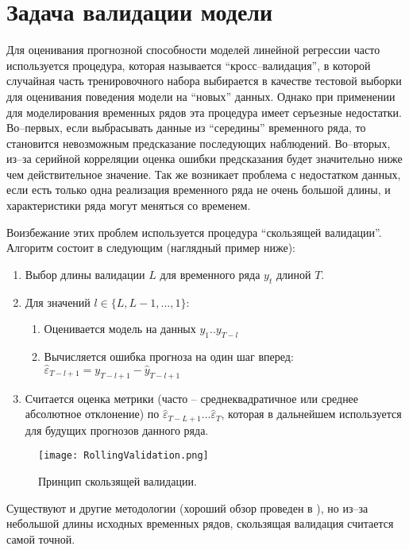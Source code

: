 \documentclass[a4paper,14pt]{extreport}
\begin{document}
	\section{Задача валидации модели}
	
	Для оценивания прогнозной способности моделей линейной регрессии часто используется процедура, которая называется ``кросс–валидация'', в которой случайная часть тренировочного набора выбирается в качестве тестовой выборки для оценивания поведения модели на ``новых'' данных. Однако при применении для моделирования временных рядов эта процедура имеет серъезные недостатки. Во–первых, если выбрасывать данные из ``середины'' временного ряда, то становится невозможным предсказание последующих наблюдений. Во–вторых, из–за серийной корреляции оценка ошибки предсказания будет значительно ниже чем действительное значение. Так же возникает проблема с недостатком данных, если есть только одна реализация временного ряда не очень большой длины, и характеристики ряда могут меняться со временем.
	
	Воизбежание этих проблем используется процедура ``скользящей валидации''. Алгоритм состоит в следующим (наглядный пример ниже):
	\begin{enumerate}
		\item Выбор длины валидации $L$ для временного ряда  $y_t$ длиной $T$.
		\item Для значений $l \in \{L, L-1, ..., 1\}$:
		\begin{enumerate}
			\item Оценивается модель на данных $y_1..y_{T-l}$
			\item Вычисляется ошибка прогноза на один шаг вперед: 
			$\hat{\varepsilon}_{T-l+1} = y_{T-l+1} - \hat{y}_{T-l+1}$
		\end{enumerate}
		\item Считается оценка метрики (часто – среднеквадратичное или среднее абсолютное отклонение) по $\hat{\varepsilon}_{T-L+1} ... \hat{\varepsilon}_{T}$, которая в дальнейшем используется для будущих прогнозов данного ряда.
	\end{enumerate}
	
	\begin{figure}
		\texttt{[image: RollingValidation.png]}
		\caption{Принцип скользящей валидации.}
		\label{fig:rolling_validation}
	\end{figure}
	
	Существуют и другие методологии (хороший обзор проведен в \cite{hyndCV}), но из–за небольшой длины исходных временных рядов, скользящая валидация считается самой точной.
	
\end{document}
